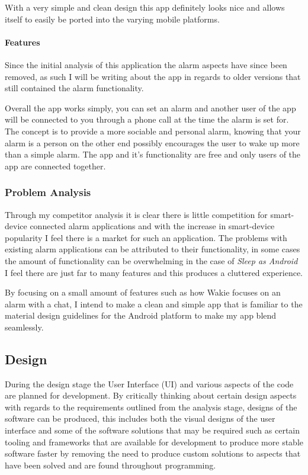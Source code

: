 With a very simple and clean design this app definitely looks nice and
allows itself to easily be ported into the varying mobile platforms.

\paragraph{Features}\label{features-2}

Since the initial analysis of this application the alarm aspects have
since been removed, as such I will be writing about the app in regards
to older versions that still contained the alarm functionality.

Overall the app works simply, you can set an alarm and another user of
the app will be connected to you through a phone call at the time the
alarm is set for. The concept is to provide a more sociable and personal
alarm, knowing that your alarm is a person on the other end possibly
encourages the user to wake up more than a simple alarm. The app and
it's functionality are free and only users of the app are connected
together.

\subsubsection{Problem Analysis}\label{problem-analysis}

Through my competitor analysis it is clear there is little competition
for smart-device connected alarm applications and with the increase in
smart-device popularity I feel there is a market for such an
application. The problems with existing alarm applications can be
attributed to their functionality, in some cases the amount of
functionality can be overwhelming in the case of \emph{Sleep as Android}
I feel there are just far to many features and this produces a cluttered
experience.

By focusing on a small amount of features such as how Wakie focuses on
an alarm with a chat, I intend to make a clean and simple app that is
familiar to the material design guidelines for the Android platform to
make my app blend seamlessly.

\subsection{Design}\label{design}

During the design stage the User Interface (UI) and various aspects of
the code are planned for development. By critically thinking about
certain design aspects with regards to the requirements outlined from
the analysis stage, designs of the software can be produced, this
includes both the visual designs of the user interface and some of the
software solutions that may be required such as certain tooling and
frameworks that are available for development to produce more stable
software faster by removing the need to produce custom solutions to
aspects that have been solved and are found throughout programming.

